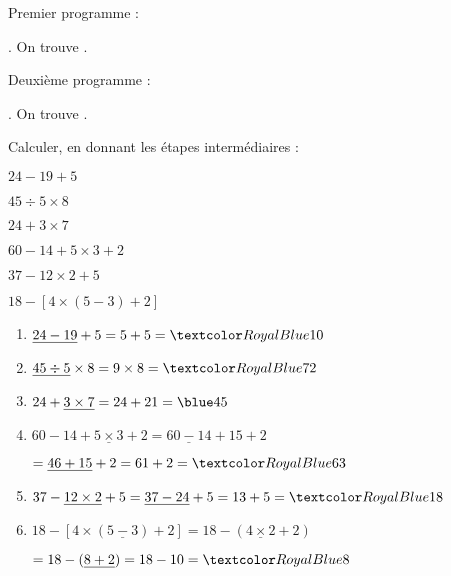 \begin{Maquette}[Fiche,CorrigeFin,Colonnes=2]{}
\begin{multicols}{2}
      \begin{Solution}
         Premier programme :  \par \smallskip
         . On trouve . \par
         Deuxième programme :   \par \smallskip
         . On trouve .
      \end{Solution}
      
      
      \begin{exercice} %
         Calculer, en donnant les étapes intermédiaires :
         \begin{colenumerate}
            \item $24-19+5$ 
            \item $45\div5\times8$
            \item $24+3\times7$
            \item $60-14+5\times3+2$
            \item $37-12\times2+5$
            \item $18-[4\times(5-3)+2]$
         \end{colenumerate}
      \end{exercice}

      \begin{Solution}
         \begin{enumerate}
            \item $\underline{24-19}+5 =5+5 =\cor{10}$ \smallskip
            \item $\underline{45\div5}\times8 =9\times8 =\cor{72}$ \smallskip
            \item $24+\underline{3\times7} =24+21 =\blue 45$ \smallskip
            \item $60-14+\underline{5\times3}+2 =\underline{60-14}+15+2$ \par
               \hspace*{28mm} $=\underline{46+15}+2 =61+2 =\cor{63}$ 
            \item $37-\underline{12\times2}+5 =\underline{37-24}+5 =13+5 =\cor{18}$ \smallskip
            \item $18-[4\times(\underline{5-3})+2] =18-(\underline{4\times2}+2)$ \par
               \hspace*{32mm} $=18-(\underline{8+2}) =18-10 =\cor{8}$
         \end{enumerate}
      \end{Solution}
      


\end{multicols}
\end{Maquette}
